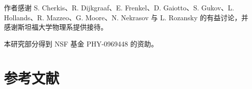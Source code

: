 \documentclass[11pt,a4paper,UTF8]{ctexart}
\theoremstyle{plain}
\theoremstyle{definition}
\begin{document}
作者感谢 S. Cherkis、R. Dijkgraaf、E. Frenkel、D. Gaiotto、S. Gukov、L. Hollands、R. Mazzeo、G. Moore、N. Nekrasov 与 L. Rozansky 的有益讨论，并感谢斯坦福大学物理系提供接待。

本研究部分得到 NSF 基金 PHY-0969448 的资助。



\section*{参考文献}

\end{document}
